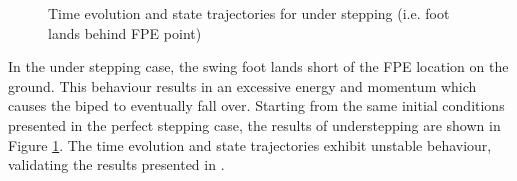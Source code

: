 \begin{figure}[!h]
	\begin{center}
	\end{center}
  	\caption{Time evolution and state trajectories for under stepping (i.e. foot lands behind FPE point)}
	\label{sim:under}
\end{figure}

In the under stepping case, the swing foot lands short of the FPE location on the ground. This behaviour results in an excessive energy and momentum which causes the biped to eventually fall over. Starting from the same initial conditions presented in the perfect stepping case, the results of understepping are shown in Figure \ref{sim:under}. The time evolution and state trajectories exhibit unstable behaviour,  validating the results presented in \cite{Wight:2008ii}. 


